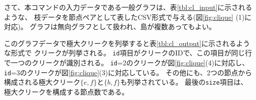 さて、本コマンドの入力データである一般グラフは、表\ref{tbl:cl_input}に示されるような、
枝データを節点ペアとして表したCSV形式で与える(図\ref{fig:clique} (1)に対応)。
グラフは無向グラフとして扱われ、島が複数あってもよい。

このグラフデータで極大クリークを列挙すると表\ref{tbl:cl_output}に示されるような形式で
クリークが列挙される。
\verb|id|項目がクリークのIDで、この項目が同じ行で一つのクリークが識別される。
\verb|id|=2のクリークが図\ref{fig:clique}(4)に対応し、
\verb|id|=3のクリークが図\ref{fig:clique}(3)に対応している。
その他にも、2つの節点から構成される極大クリーク$\{e,f\}$と$\{b,f\}$も列挙されている。
最後の\verb|size|項目は、極大クリークを構成する節点数である。


